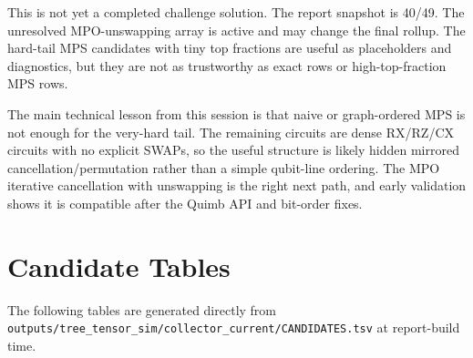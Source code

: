 \documentclass[10pt]{article}
\begin{document}
This is not yet a completed challenge solution. The report snapshot is 40/49. The unresolved MPO-unswapping array is active and may change the final rollup. The hard-tail MPS candidates with tiny top fractions are useful as placeholders and diagnostics, but they are not as trustworthy as exact rows or high-top-fraction MPS rows.

The main technical lesson from this session is that naive or graph-ordered MPS is not enough for the very-hard tail. The remaining circuits are dense RX/RZ/CX circuits with no explicit SWAPs, so the useful structure is likely hidden mirrored cancellation/permutation rather than a simple qubit-line ordering. The MPO iterative cancellation with unswapping is the right next path, and early validation shows it is compatible after the Quimb API and bit-order fixes.

\section*{Candidate Tables}

The following tables are generated directly from \texttt{outputs/tree\_tensor\_sim/collector\_current/CANDIDATES.tsv} at report-build time.


\end{document}

